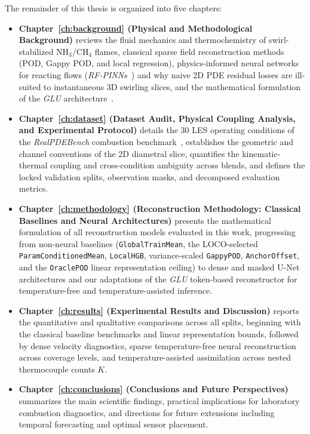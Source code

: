 The remainder of this thesis is organized into five chapters:
\begin{itemize}
    \item \textbf{Chapter~\ref{ch:background} (Physical and Methodological Background)} reviews the fluid mechanics and thermochemistry of swirl-stabilized $\text{NH}_3/\text{CH}_4$ flames, classical sparse field reconstruction methods (POD, Gappy POD, and local regression), physics-informed neural networks for reacting flows (\textit{RF-PINNs}~\cite{yadav2025rfpinns}) and why naive 2D PDE residual losses are ill-suited to instantaneous 3D swirling slices, and the mathematical formulation of the \textit{GLU} architecture~\cite{wang2026glu}.
    \item \textbf{Chapter~\ref{ch:dataset} (Dataset Audit, Physical Coupling Analysis, and Experimental Protocol)} details the 30 LES operating conditions of the \textit{RealPDEBench} combustion benchmark~\cite{hu2026realpdebench}, establishes the geometric and channel conventions of the 2D diametral slice, quantifies the kinematic-thermal coupling and cross-condition ambiguity across blends, and defines the locked validation splits, observation masks, and decomposed evaluation metrics.
    \item \textbf{Chapter~\ref{ch:methodology} (Reconstruction Methodology: Classical Baselines and Neural Architectures)} presents the mathematical formulation of all reconstruction models evaluated in this work, progressing from non-neural baselines (\texttt{GlobalTrainMean}, the LOCO-selected \texttt{ParamConditionedMean}, \texttt{LocalHGB}, variance-scaled \texttt{GappyPOD}, \texttt{AnchorOffset}, and the \texttt{OraclePOD} linear representation ceiling) to dense and masked U-Net architectures and our adaptations of the \textit{GLU} token-based reconstructor for temperature-free and temperature-assisted inference.
    \item \textbf{Chapter~\ref{ch:results} (Experimental Results and Discussion)} reports the quantitative and qualitative comparisons across all splits, beginning with the classical baseline benchmarks and linear representation bounds, followed by dense velocity diagnostics, sparse temperature-free neural reconstruction across coverage levels, and temperature-assisted assimilation across nested thermocouple counts $K$.
    \item \textbf{Chapter~\ref{ch:conclusions} (Conclusions and Future Perspectives)} summarizes the main scientific findings, practical implications for laboratory combustion diagnostics, and directions for future extensions including temporal forecasting and optimal sensor placement.
\end{itemize}
